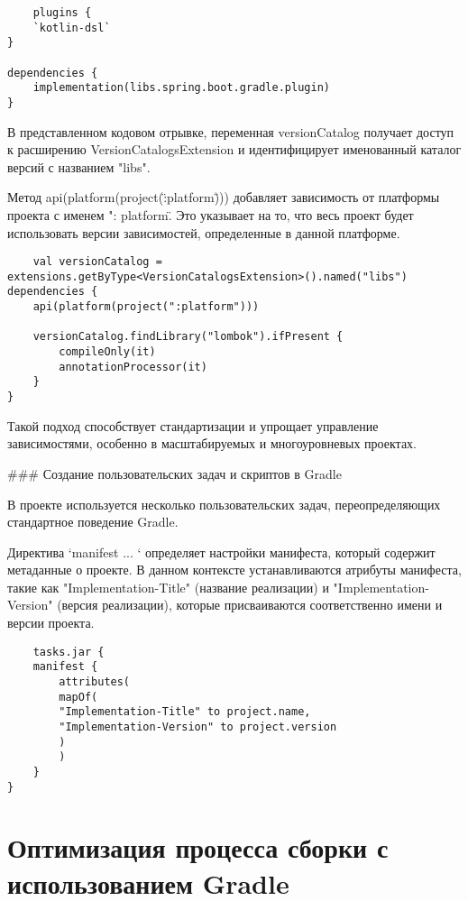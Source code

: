 \begin{lstlisting}
    plugins {
    `kotlin-dsl`
}

dependencies {
    implementation(libs.spring.boot.gradle.plugin)
}
\end{lstlisting}


В представленном кодовом отрывке, переменная versionCatalog получает доступ к расширению
VersionCatalogsExtension и идентифицирует именованный каталог версий с названием "libs".

Метод api(platform(project(\":platform\"))) добавляет зависимость от платформы проекта с именем ":
platform\". Это указывает на то, что весь проект будет использовать версии зависимостей, определенные
в данной платформе.

\begin{lstlisting}
    val versionCatalog = extensions.getByType<VersionCatalogsExtension>().named("libs")
dependencies {
    api(platform(project(":platform")))

    versionCatalog.findLibrary("lombok").ifPresent {
        compileOnly(it)
        annotationProcessor(it)
    }
}
\end{lstlisting}



Такой подход способствует стандартизации и упрощает управление зависимостями, особенно в
масштабируемых и многоуровневых проектах.

\#\#\# Создание пользовательских задач и скриптов в Gradle

В проекте используется несколько пользовательских задач, переопределяющих стандартное поведение
Gradle.

Директива `manifest { ... }` определяет настройки манифеста, который содержит метаданные о проекте.
В данном контексте устанавливаются атрибуты манифеста, такие как "Implementation-Title" (название
реализации) и "Implementation-Version" (версия реализации), которые присваиваются соответственно
имени и версии проекта.

\begin{lstlisting}
    tasks.jar {
    manifest {
        attributes(
        mapOf(
        "Implementation-Title" to project.name,
        "Implementation-Version" to project.version
        )
        )
    }
}
\end{lstlisting}


\section{Оптимизация процесса сборки с использованием Gradle}

